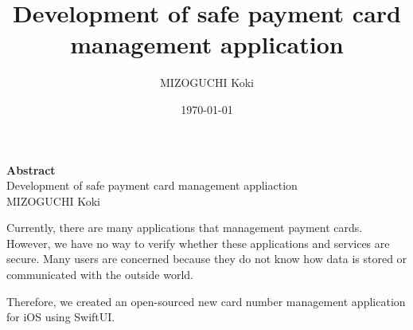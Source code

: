 \documentclass[paper=a4,12pt]{report}
\title{\Huge \textbf{Development of safe payment card management application}}
\author{\LARGE MIZOGUCHI Koki}
\date{\today}
\begin{document}
\maketitle
\begin{center}
    {\LARGE\textbf{Abstract}}\\\vspace{1em}
    {\Large Development of safe payment card management appliaction}\\\vspace{1em}
    {MIZOGUCHI Koki}
\end{center}

Currently, there are many applications that management payment cards.
However, we have no way to verify whether these applications and services are secure.
Many users are concerned because they do not know how data is stored or communicated with the outside world.

Therefore, we created an open-sourced new card number management application for iOS using SwiftUI.
\tableofcontents
\chapter{}
\end{document}
